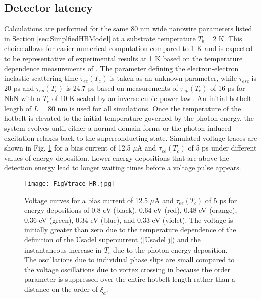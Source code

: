 \documentclass[%
reprint,
 amsmath,amssymb,
aps,
pra,
]{revtex4-1}
\begin{document}
\subsection{\label{sec:TDGLLatency}Detector latency}
Calculations are performed for the same 80 nm wide nanowire parameters listed in Section \ref{sec:SimplfiedHBModel} at a substrate temperature \(T_b\)= 2 K.  This choice allows for easier numerical computation compared to 1 K and is expected to be representative of experimental results at 1 K based on the temperature dependence measurements of \cite{korzh_demonstrating_2018}.  The parameter defining the electron-electron inelastic scattering time \(\tau_{ee}\left(T_c\right) \) is taken as an unknown parameter, while \(\tau_{esc}\) is 20 ps and \(\tau_{ep}\left(T_c\right) \) is 24.7 ps based on measurements of \(\tau_{ep}\left(T_c\right) \) of 16 ps for NbN with a \(T_c\) of 10 K scaled by an inverse cubic power law \cite{vodolazov_single-photon_2017,semenov_analysis_1995}.  An initial hotbelt length of $L=80$ nm is used for all simulations.  Once the temperature of the hotbelt is elevated to the initial temperature governed by the photon energy, the system evolves until either a normal domain forms or the photon-induced excitation relaxes back to the superconducting state. Simulated voltage traces are shown in Fig. \ref{F Vtrace} for a bias current of 12.5 \(\mu\)A and \(\tau_{ee}\left(T_c\right) \) of 5 ps under different values of energy deposition.  Lower energy depositions that are above the detection energy lead to longer waiting times before a voltage pulse appears.

\begin{figure}
\texttt{[image: FigVtrace\_HR.jpg]}
\caption{Voltage curves for a bias current of 12.5 \(\mu\)A and \(\tau_{ee}\left(T_c\right) \) of 5 ps for energy depositions of 0.8 eV (black), 0.64 eV (red), 0.48 eV (orange), 0.36 eV (green), 0.34 eV (blue), and 0.33 eV (violet).  The voltage is initially greater than zero due to the temperature dependence of the definition of the Usadel supercurrent (\ref{Usadel j}) and the instantaneous increase in \(T_e\) due to the photon energy deposition.  The oscillations due to  individual phase slips are small compared to the voltage oscillations due to vortex crossing in \cite{vodolazov_single-photon_2017} because the order parameter is suppressed over the entire hotbelt length rather than a distance on the order of \(\xi_c\).
}
\label{F Vtrace}
\end{figure}
\end{document}

